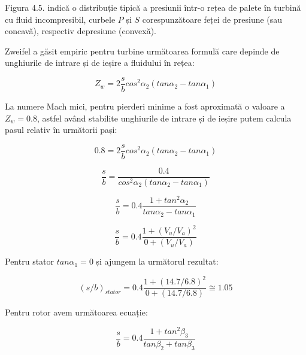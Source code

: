 Figura 4.5. indică o distribuție tipică a presiunii într-o rețea de palete în turbină cu fluid incompresibil, curbele $P$ și $S$ corespunzătoare feței de presiune (sau concavă), respectiv depresiune (convexă).

Zweifel a găsit empiric pentru turbine următoarea formulă care depinde de unghiurile de intrare și de ieșire a fluidului în rețea:

\begin{equation}
Z_w = 2 \frac{s}{b} cos^2\alpha_2 (tan\alpha_2 - tan\alpha_1)
\end{equation}

La numere Mach mici, pentru pierderi minime a fost aproximată o valoare a $Z_w = 0.8$, astfel având stabilite unghiurile de intrare și de ieșire putem calcula pasul relativ în următorii pași:

\begin{equation}
0.8 = 2 \frac{s}{b} cos^2\alpha_2 (tan\alpha_2 - tan\alpha_1)
\end{equation}

\begin{equation}
\frac{s}{b} = \frac{0.4}{cos^2\alpha_2 (tan\alpha_2 - tan\alpha_1)}
\end{equation}

\begin{equation}
\frac{s}{b} = 0.4 \frac{1+tan^2\alpha_2}{tan\alpha_2 - tan\alpha_1}
\end{equation}

\begin{equation}
\frac{s}{b} = 0.4 \frac{1 + (V_u / V_a)^2 } {0 + (V_u / V_a)}
\end{equation}

\vspace{5mm} %

Pentru stator $tan\alpha_1 = 0$ și ajungem la următorul rezultat:

\begin{equation}
(s/b)_{stator} = 0.4 \frac{1 + (14.7 / 6.8)^2 } {0 + (14.7 / 6.8)}\cong 1.05
\end{equation}

\vspace{5mm} %

Pentru rotor avem următoarea ecuație:

\begin{equation}
\frac{s}{b} = 0.4 \frac{1+tan^2\beta_3}{tan\beta_2 + tan\beta_3}
\end{equation}

